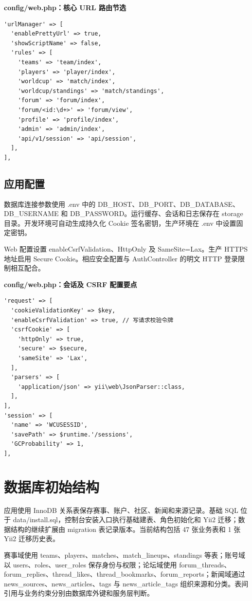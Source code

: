 \documentclass[UTF8,a4paper,11pt]{ctexart}
\begin{document}
\noindent\textbf{config/web.php：核心 URL 路由节选}\par\vspace{2pt}
\begin{lstlisting}
'urlManager' => [
  'enablePrettyUrl' => true,
  'showScriptName' => false,
  'rules' => [
    'teams' => 'team/index',
    'players' => 'player/index',
    'worldcup' => 'match/index',
    'worldcup/standings' => 'match/standings',
    'forum' => 'forum/index',
    'forum/<id:\d+>' => 'forum/view',
    'profile' => 'profile/index',
    'admin' => 'admin/index',
    'api/v1/session' => 'api/session',
  ],
],
\end{lstlisting}
\subsection{应用配置}
数据库连接参数使用 .env 中的 DB\_HOST、DB\_PORT、DB\_DATABASE、DB\_USERNAME 和 DB\_PASSWORD。运行缓存、会话和日志保存在 storage 目录。开发环境可自动生成持久化 Cookie 签名密钥，生产环境在 .env 中设置固定密钥。

Web 配置设置 enableCsrfValidation、HttpOnly 及 SameSite=Lax。生产 HTTPS 地址启用 Secure Cookie。相应安全配置与 AuthController 的明文 HTTP 登录限制相互配合。

\noindent\textbf{config/web.php：会话及 CSRF 配置要点}\par\vspace{2pt}
\begin{lstlisting}
'request' => [
  'cookieValidationKey' => $key,
  'enableCsrfValidation' => true, // 写请求校验令牌
  'csrfCookie' => [
    'httpOnly' => true,
    'secure' => $secure,
    'sameSite' => 'Lax',
  ],
  'parsers' => [
    'application/json' => yii\web\JsonParser::class,
  ],
],
'session' => [
  'name' => 'WCUSESSID',
  'savePath' => $runtime.'/sessions',
  'GCProbability' => 1,
],
\end{lstlisting}
\section{数据库初始结构}
应用使用 InnoDB 关系表保存赛事、账户、社区、新闻和来源记录。基础 SQL 位于 data/install.sql，控制台安装入口执行基础建表、角色初始化和 Yii2 迁移；数据结构的继续扩展由 migration 表记录版本。当前结构包括 47 张业务表和 1 张 Yii2 迁移历史表。

赛事域使用 teams、players、matches、match\_lineups、standings 等表；账号域以 users、roles、user\_roles 保存身份与权限；论坛域使用 forum\_threads、forum\_replies、thread\_likes、thread\_bookmarks、forum\_reports；新闻域通过 news\_sources、news\_articles、tags 与 news\_article\_tags 组织来源和分类。表间引用与业务约束分别由数据库外键和服务层判断。
\end{document}

